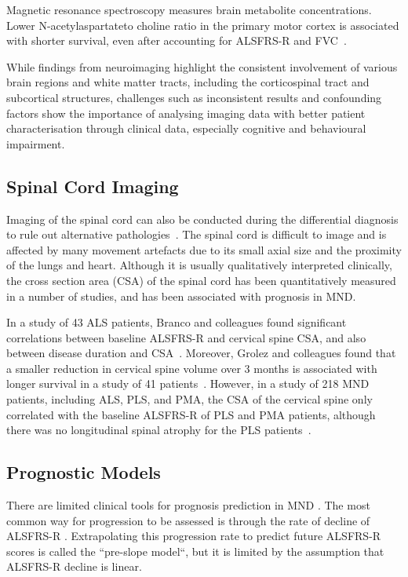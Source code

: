 Magnetic resonance spectroscopy measures brain metabolite concentrations.
Lower N-acetylaspartateto choline ratio in the primary motor cortex is associated with shorter survival, even after accounting for ALSFRS-R and FVC~\cite{kalraCerebralDegenerationPredicts2006}.

While findings from neuroimaging highlight the consistent involvement of various brain regions and white matter tracts, including the corticospinal tract and subcortical structures, challenges such as inconsistent results and confounding factors show the importance of analysing imaging data with better patient characterisation through clinical data, especially cognitive and behavioural impairment.

\subsection{Spinal Cord Imaging}

Imaging of the spinal cord can also be conducted during the differential diagnosis to rule out alternative pathologies~\cite{elmendiliSpinalCordImaging2019}.
The spinal cord is difficult to image and is affected by many movement artefacts due to its small axial size and the proximity of the lungs and heart.
Although it is usually qualitatively interpreted clinically, the cross section area (CSA) of the spinal cord has been quantitatively measured in a number of studies, and has been associated with prognosis in MND.

In a study of 43 ALS patients, Branco and colleagues found significant correlations between baseline ALSFRS-R and cervical spine CSA, and also between disease duration and CSA~\cite{brancoSpinalCordAtrophy2014}.
Moreover, Grolez and colleagues found that a smaller reduction in cervical spine volume over 3 months is associated with longer survival in a study of 41 patients~\cite{grolezMRICervicalSpinal2018}.
However, in a study of 218 MND patients, including ALS, PLS, and PMA, the CSA of the cervical spine only correlated with the baseline ALSFRS-R of PLS and PMA patients, although there was no longitudinal spinal atrophy for the PLS patients~\cite{vanderburghCrosssectionalLongitudinalAssessment2019}.


\subsection{Prognostic Models}
There are limited clinical tools for prognosis prediction in MND .
The most common way for progression to be assessed is through the rate of decline of ALSFRS-R .
Extrapolating this progression rate to predict future ALSFRS-R scores is called the ``pre-slope model``, but it is limited by the assumption that ALSFRS-R decline is linear.

